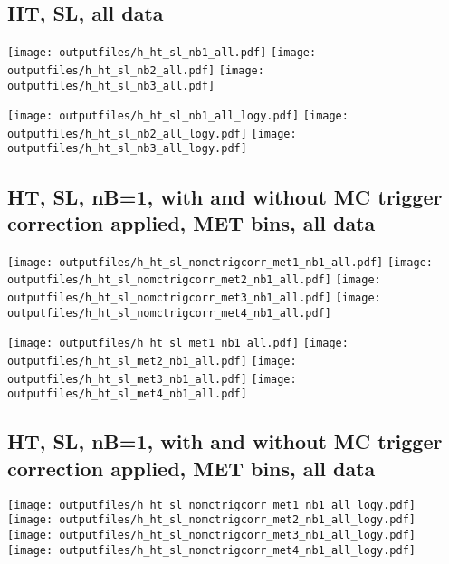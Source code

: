 \documentclass[11pt]{article}
\begin{document}
    \subsection{ HT, SL, all data}

    \noindent
     \texttt{[image: outputfiles/h\_ht\_sl\_nb1\_all.pdf]}
     \texttt{[image: outputfiles/h\_ht\_sl\_nb2\_all.pdf]}
     \texttt{[image: outputfiles/h\_ht\_sl\_nb3\_all.pdf]}

    \noindent
     \texttt{[image: outputfiles/h\_ht\_sl\_nb1\_all\_logy.pdf]}
     \texttt{[image: outputfiles/h\_ht\_sl\_nb2\_all\_logy.pdf]}
     \texttt{[image: outputfiles/h\_ht\_sl\_nb3\_all\_logy.pdf]}


     \subsection{ HT, SL, nB=1, with and without MC trigger correction applied, MET bins, all data}

    \noindent
     \texttt{[image: outputfiles/h\_ht\_sl\_nomctrigcorr\_met1\_nb1\_all.pdf]}
     \texttt{[image: outputfiles/h\_ht\_sl\_nomctrigcorr\_met2\_nb1\_all.pdf]}
     \texttt{[image: outputfiles/h\_ht\_sl\_nomctrigcorr\_met3\_nb1\_all.pdf]}
     \texttt{[image: outputfiles/h\_ht\_sl\_nomctrigcorr\_met4\_nb1\_all.pdf]}

    \noindent
     \texttt{[image: outputfiles/h\_ht\_sl\_met1\_nb1\_all.pdf]}
     \texttt{[image: outputfiles/h\_ht\_sl\_met2\_nb1\_all.pdf]}
     \texttt{[image: outputfiles/h\_ht\_sl\_met3\_nb1\_all.pdf]}
     \texttt{[image: outputfiles/h\_ht\_sl\_met4\_nb1\_all.pdf]}

   \clearpage
     \subsection{ HT, SL, nB=1, with and without MC trigger correction applied, MET bins, all data}

    \noindent
     \texttt{[image: outputfiles/h\_ht\_sl\_nomctrigcorr\_met1\_nb1\_all\_logy.pdf]}
     \texttt{[image: outputfiles/h\_ht\_sl\_nomctrigcorr\_met2\_nb1\_all\_logy.pdf]}
     \texttt{[image: outputfiles/h\_ht\_sl\_nomctrigcorr\_met3\_nb1\_all\_logy.pdf]}
     \texttt{[image: outputfiles/h\_ht\_sl\_nomctrigcorr\_met4\_nb1\_all\_logy.pdf]}
\end{document}

